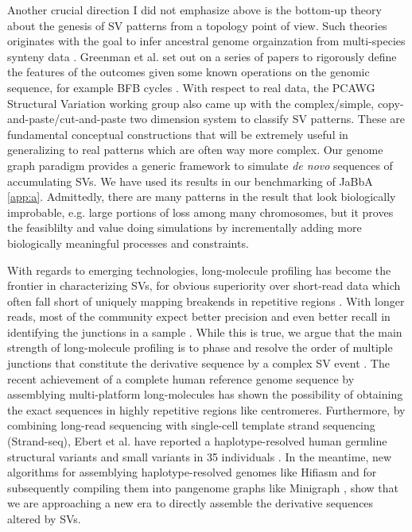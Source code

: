 \documentclass[phd,tocprelim]{cornell}
\begin{document}
Another crucial direction I did not emphasize above is the bottom-up theory about the genesis of SV patterns from a topology point of view. Such theories originates with the goal to infer ancestral genome orgainzation from multi-species synteny data \cite{Medvedev:2010bm}. Greenman et al. set out on a series of papers to rigorously define the features of the outcomes given some known operations on the genomic sequence, for example BFB cycles \cite{greenman2016-ho}. With respect to real data, the PCAWG Structural Variation working group also came up with the complex/simple, copy-and-paste/cut-and-paste two dimension system to classify SV patterns. These are fundamental conceptual constructions that will be extremely useful in generalizing to real patterns which are often way more complex. Our genome graph paradigm provides a generic framework to simulate \textit{de novo} sequences of accumulating SVs. We have used its results in our benchmarking of JaBbA \ref{app:a}. Admittedly, there are many patterns in the result that look biologically improbable, e.g. large portions of loss among many chromosomes, but it proves the feasiblilty and value doing simulations by incrementally adding more biologically meaningful processes and constraints.

With regards to emerging technologies, long-molecule profiling has become the frontier in characterizing SVs, for obvious superiority over short-read data which often fall short of uniquely mapping breakends in repetitive regions \cite{Behr2021-gf}. With longer reads, most of the community expect better precision and even better recall in identifying the junctions in a sample \cite{Zhao2021-bi}. While this is true, we argue that the main strength of long-molecule profiling is to phase and resolve the order of multiple junctions that constitute the derivative sequence by a complex SV event \cite{Behr2021-gf,Hadi2020-um,Luebeck2020-ow,Aganezov2020-cu}. The recent achievement of a complete human reference genome sequence by assemblying multi-platform long-molecules \cite{Nurk2021-ro} has shown the possibility of obtaining the exact sequences in highly repetitive regions like centromeres. Furthermore, by combining long-read sequencing with single-cell template strand sequencing (Strand-seq), Ebert et al. have reported a haplotype-resolved human germline structural variants and small variants in 35 individuals \cite{Ebert2021-hl}. In the meantime, new algorithms for assemblying haplotype-resolved genomes like Hifiasm \cite{Cheng2021-nh} and for subsequently compiling them into pangenome graphs like Minigraph \cite{Li2020-ai}, show that we are approaching a new era to directly assemble the derivative sequences altered by SVs.
\end{document}
